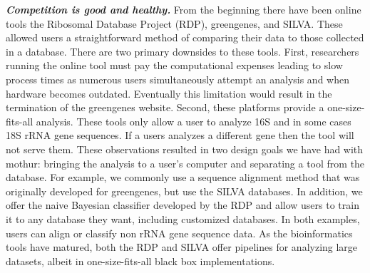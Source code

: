 \documentclass[11pt,]{article}
\begin{document}
\textbf{\emph{Competition is good and healthy.}} From the beginning
there have been online tools the Ribosomal Database Project (RDP),
greengenes, and SILVA. These allowed users a straightforward method of
comparing their data to those collected in a database. There are two
primary downsides to these tools. First, researchers running the online
tool must pay the computational expenses leading to slow process times
as numerous users simultaneously attempt an analysis and when hardware
becomes outdated. Eventually this limitation would result in the
termination of the greengenes website. Second, these platforms provide a
one-size-fits-all analysis. These tools only allow a user to analyze 16S
and in some cases 18S rRNA gene sequences. If a users analyzes a
different gene then the tool will not serve them. These observations
resulted in two design goals we have had with mothur: bringing the
analysis to a user's computer and separating a tool from the database.
For example, we commonly use a sequence alignment method that was
originally developed for greengenes, but use the SILVA databases. In
addition, we offer the naive Bayesian classifier developed by the RDP
and allow users to train it to any database they want, including
customized databases. In both examples, users can align or classify non
rRNA gene sequence data. As the bioinformatics tools have matured, both
the RDP and SILVA offer pipelines for analyzing large datasets, albeit
in one-size-fits-all black box implementations.
\end{document}
